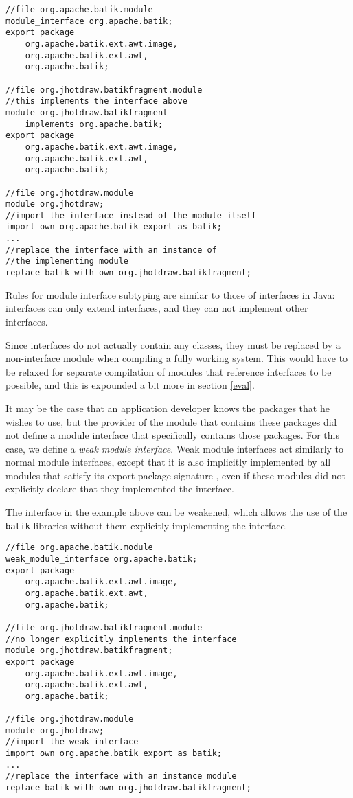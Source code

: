 \begin{lstlisting}[caption=Module Interfaces]
//file org.apache.batik.module
module_interface org.apache.batik;
export package 
	org.apache.batik.ext.awt.image,
	org.apache.batik.ext.awt,
	org.apache.batik;

//file org.jhotdraw.batikfragment.module
//this implements the interface above
module org.jhotdraw.batikfragment 
	implements org.apache.batik;
export package 
	org.apache.batik.ext.awt.image,
	org.apache.batik.ext.awt,
	org.apache.batik;

//file org.jhotdraw.module
module org.jhotdraw;
//import the interface instead of the module itself
import own org.apache.batik export as batik;
...
//replace the interface with an instance of
//the implementing module
replace batik with own org.jhotdraw.batikfragment; 
\end{lstlisting}

Rules for module interface subtyping are similar to those of interfaces in Java:
interfaces can only extend interfaces, and they can not implement other
interfaces. 

Since interfaces do not actually contain any classes, they must be replaced
by a non-interface module when compiling a fully working system. This would
have to be relaxed for separate compilation of modules that reference interfaces
to be possible, and this is expounded a bit more in section \ref{eval}.


It may be the case that an application developer knows the packages that
he wishes to use, but the provider of the module that contains these packages 
did not define a module interface that specifically contains those packages. For
this case, we define a \textit{weak module interface}. Weak module interfaces act similarly
to normal module interfaces, except that it is also implicitly implemented
by all modules that satisfy its export package signature \cite{mcdirmid01jiazzi, componentnextgen}, 
even if these modules did not explicitly declare that they implemented the interface.

The interface in the example above can be weakened, which allows the use
of the \texttt{batik} libraries without them explicitly implementing the interface.

\begin{lstlisting}[caption=Weak Interfaces]
//file org.apache.batik.module
weak_module_interface org.apache.batik;
export package 
	org.apache.batik.ext.awt.image,
	org.apache.batik.ext.awt,	
	org.apache.batik;

//file org.jhotdraw.batikfragment.module
//no longer explicitly implements the interface
module org.jhotdraw.batikfragment;
export package 
	org.apache.batik.ext.awt.image,
	org.apache.batik.ext.awt, 
	org.apache.batik;
	
//file org.jhotdraw.module
module org.jhotdraw;
//import the weak interface 
import own org.apache.batik export as batik;
...
//replace the interface with an instance module
replace batik with own org.jhotdraw.batikfragment; 
\end{lstlisting}

